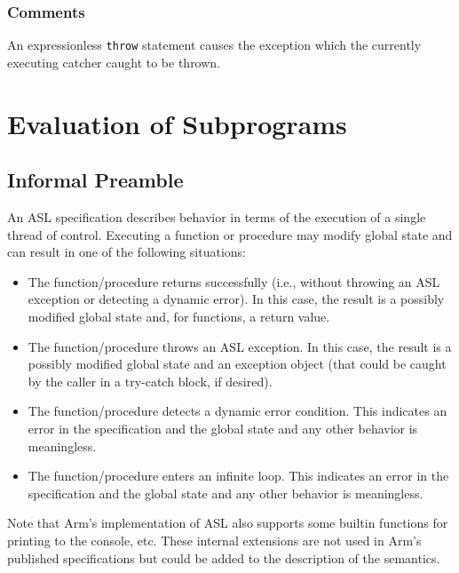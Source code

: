 \documentclass{book}
\begin{document}
\subsection{Comments}
An expressionless \texttt{throw} statement causes the exception which the
currently executing catcher caught to be thrown.

\chapter{Evaluation of Subprograms \label{chap:eval_call}}

\section{Informal Preamble}


An ASL specification describes behavior in terms of the execution of a single
thread of control. Executing a function or procedure may modify global state
and can result in one of the following situations:
\begin{itemize}
\item The function/procedure returns successfully (i.e., without throwing an
ASL exception or detecting a dynamic error). In this case, the result is a
possibly modified global state and, for functions, a return value.
\item The function/procedure throws an ASL exception. In this case, the result
is a possibly modified global state and an exception object (that could be
caught by the caller in a try-catch block, if desired).
\item The function/procedure detects a dynamic error condition. This indicates
an error in the specification and the global state and any other behavior is
meaningless.
\item The function/procedure enters an infinite loop. This indicates an error
in the specification and the global state and any other behavior is
meaningless.
\end{itemize}

Note that Arm’s implementation of ASL also supports some builtin functions for
printing to the console, etc. These internal extensions are not used in Arm’s
published specifications but could be added to the description of the
semantics.
\end{document}
